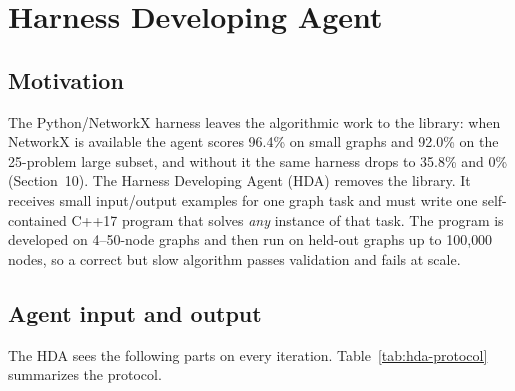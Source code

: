 \documentclass[11pt]{article}
\begin{document}
\section{Harness Developing Agent}

\subsection{Motivation}
The Python/NetworkX harness leaves the algorithmic work to the library: when
NetworkX is available the agent scores 96.4\% on small graphs and 92.0\% on the
25-problem large subset, and without it the same harness drops to 35.8\% and
0\% (Section~10). The Harness Developing Agent (HDA) removes the library. It
receives small input/output examples for one graph task and must write one
self-contained C++17 program that solves \emph{any} instance of that task. The
program is developed on 4--50-node graphs and then run on held-out graphs up to
100{,}000 nodes, so a correct but slow algorithm passes validation and fails at
scale.

\subsection{Agent input and output}
The HDA sees the following parts on every iteration. Table~\ref{tab:hda-protocol}
summarizes the protocol.
\end{document}
